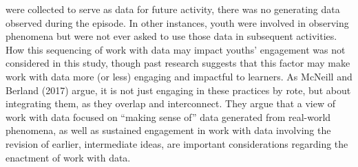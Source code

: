 \documentclass[]{msu-thesis}
\theoremstyle{definition}
\theoremstyle{definition}
\theoremstyle{definition}
\theoremstyle{remark}
\begin{document}
were collected to serve as data for future activity, there was no
generating data observed during the episode. In other instances, youth
were involved in observing phenomena but were not ever asked to use
those data in subsequent activities. How this sequencing of work with
data may impact youths' engagement was not considered in this study,
though past research suggests that this factor may make work with data
more (or less) engaging and impactful to learners. As McNeill and
Berland (2017) argue, it is not just engaging in these practices by
rote, but about integrating them, as they overlap and interconnect. They
argue that a view of work with data focused on ``making sense of'' data
generated from real-world phenomena, as well as sustained engagement in
work with data involving the revision of earlier, intermediate ideas,
are important considerations regarding the enactment of work with data.
\end{document}
